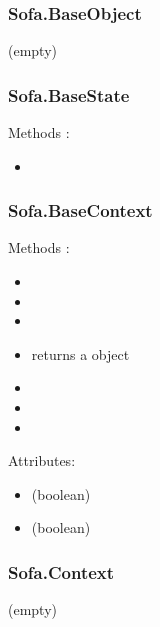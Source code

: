 \subsubsection{Sofa.BaseObject}
(empty)

\subsubsection{Sofa.BaseState}
Methods :
\begin{itemize}
\item {}
\end{itemize}

\subsubsection{Sofa.BaseContext}
Methods :
\begin{itemize}
\item {} 
\item {} 
\item {} 
\item {} returns a  object
\item {} 
\item {}
\item {}
\end{itemize}
Attributes:
\begin{itemize}
\item {}  (boolean)
\item {}  (boolean)
\end{itemize}


\subsubsection{Sofa.Context}
(empty)
